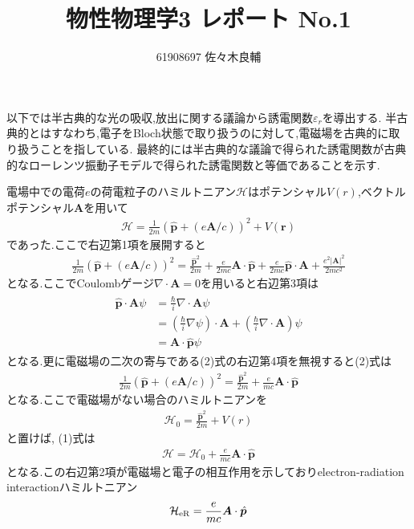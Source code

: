 \documentclass[uplatex,a4j,11pt,dvipdfmx]{jsarticle}
\begin{document}
\title{物性物理学3 レポート No.1}
\author{61908697 佐々木良輔}
\date{}
\maketitle
以下では半古典的な光の吸収,放出に関する議論から誘電関数$\varepsilon_r$を導出する.
半古典的とはすなわち,電子をBloch状態で取り扱うのに対して,電磁場を古典的に取り扱うことを指している.
最終的には半古典的な議論で得られた誘電関数が古典的なローレンツ振動子モデルで得られた誘電関数と等価であることを示す.

電場中での電荷$e$の荷電粒子のハミルトニアン$\mathcal{H}$はポテンシャル$V(r)$,ベクトルポテンシャル$\bm A$を用いて
\begin{align}
  \mathcal{H}=\frac{1}{2m}\left(\hat{{\bm p}}+(e{\bm A}/c)\right)^2+V({\bm r})
\end{align}
であった.ここで右辺第1項を展開すると
\begin{align}
  \frac{1}{2m}\left(\hat{{\bm p}}+(e{\bm A}/c)\right)^2=\frac{\hat{\bm p}^2}{2m}
  +\frac{e}{2mc}{\bm A}\cdot\hat{\bm p}
  +\frac{e}{2mc}\hat{\bm p}\cdot{\bm A}
  +\frac{e^2|{\bm A}|^2}{2mc^2}
\end{align}
となる.ここでCoulombゲージ$\nabla\cdot{\bm A}=0$を用いると右辺第3項は
\begin{align}
  \begin{split}
    \hat{\bm p}\cdot{\bm A}\psi&=\frac{\hbar}{i}\nabla\cdot{\bm A}\psi\\
    &=\left(\frac{\hbar}{i}\nabla\psi\right)\cdot{\bm A}+\left(\frac{\hbar}{i}\nabla\cdot{\bm A}\right)\psi\\
    &={\bm A}\cdot\hat{\bm p}\psi
  \end{split}
\end{align}
となる.更に電磁場の二次の寄与である(2)式の右辺第4項を無視すると(2)式は
\begin{align}
  \frac{1}{2m}\left(\hat{{\bm p}}+(e{\bm A}/c)\right)^2=\frac{\hat{\bm p}^2}{2m}+\frac{e}{mc}{\bm A}\cdot\hat{\bm p}
\end{align}
となる.ここで電磁場がない場合のハミルトニアンを
\begin{align}
  \mathcal{H}_0=\frac{\hat{\bm p}^2}{2m}+V(r)
\end{align}
と置けば, (1)式は
\begin{align}
  \mathcal{H}=\mathcal{H}_0+\frac{e}{mc}{\bm A}\cdot\hat{\bm p}
\end{align}
となる.この右辺第2項が電磁場と電子の相互作用を示しておりelectron-radiation interactionハミルトニアン
\begin{align}
  \mathcal{H}_{\rm eR}=\frac{e}{mc}{\bm A}\cdot\hat{\bm p}
\end{align}
\end{document}
